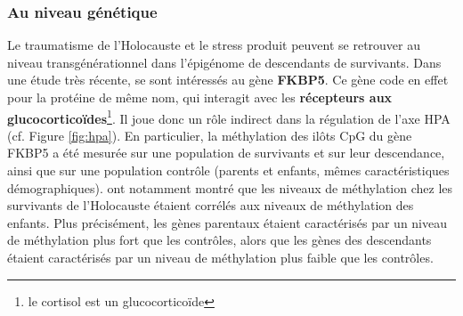 \documentclass[french]{article}
\begin{document}
			\subsubsection{Au niveau génétique}
				Le traumatisme de l'Holocauste et le stress produit peuvent se retrouver au niveau transgénérationnel dans l'épigénome de descendants de survivants. Dans une étude très récente, \cite{yehuda2016} se sont intéressés au gène \textbf{FKBP5}. Ce gène code en effet pour la protéine de même nom, qui interagit avec les \textbf{récepteurs aux glucocorticoïdes}\footnote{le cortisol est un glucocorticoïde}. Il joue donc un rôle indirect dans la régulation de l'axe HPA (cf. Figure \ref{fig:hpa}). En particulier, la méthylation des ilôts CpG du gène FKBP5 a été mesurée sur une population de survivants et sur leur descendance, ainsi que sur une population contrôle (parents et enfants, mêmes caractéristiques démographiques). \cite{yehuda2016} ont notamment montré que les niveaux de méthylation chez les survivants de l'Holocauste étaient corrélés aux niveaux de méthylation des enfants. Plus précisément, les gènes parentaux étaient caractérisés par un niveau de méthylation plus fort que les contrôles, alors que les gènes des descendants étaient caractérisés par un niveau de méthylation plus faible que les contrôles.\\
				
\end{document}
